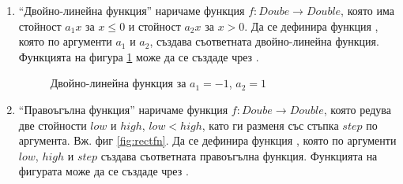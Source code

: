 \begin{enumerate}[]

\item ``Двойно-линейна функция'' наричаме функция $f:Doube \rightarrow Double$, която има стойност $a_1x$  за $x \leq 0$ и стойност $a_2x$ за $x > 0$. Да се дефинира функция , която по аргументи $a_1$ и $a_2$, създава съответната двойно-линейна функция. Функцията на фигура \ref{fig:dlin} може да се създаде чрез .


    \begin{figure}
    \centering


      \caption{Двойно-линейна функция за $a_1=-1$, $a_2=1$}
      \label{fig:dlin}
    \end{figure}



\item ``Правоъгълна функция'' наричаме функция $f:Doube \rightarrow Double$, която редува две стойности $low$ и $high$, $low < high$, като ги разменя със стъпка $step$ по аргумента. Вж. фиг \ref{fig:rectfn}. Да се дефинира функция , която по аргументи $low$, $high$ и $step$ създава съответната правоъгълна функция. Функцията на фигурата може да се създаде чрез .

    \begin{figure}
    \centering

\end{figure}
\end{enumerate}
